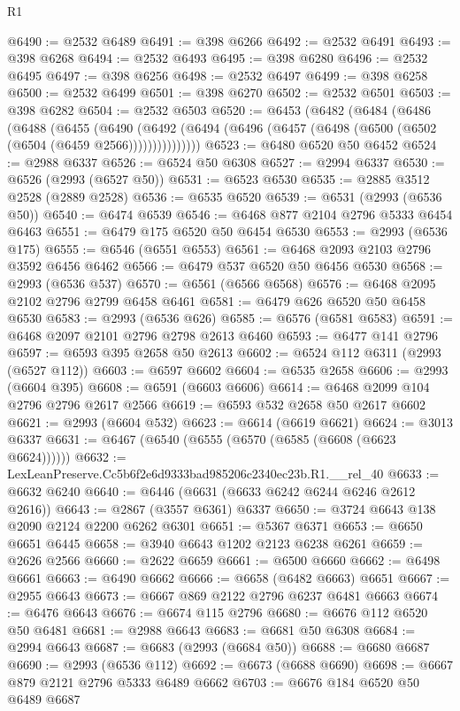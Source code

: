 \begin{lexlean}{R1}
\begin{coremodule}
@6490 := @2532 @6489
@6491 := @398 @6266
@6492 := @2532 @6491
@6493 := @398 @6268
@6494 := @2532 @6493
@6495 := @398 @6280
@6496 := @2532 @6495
@6497 := @398 @6256
@6498 := @2532 @6497
@6499 := @398 @6258
@6500 := @2532 @6499
@6501 := @398 @6270
@6502 := @2532 @6501
@6503 := @398 @6282
@6504 := @2532 @6503
@6520 := @6453
    (@6482
      (@6484
        (@6486
          (@6488
            (@6455
              (@6490
                (@6492 (@6494 (@6496 (@6457 (@6498 (@6500 (@6502 (@6504 (@6459 @2566)))))))))))))))
@6523 := @6480 @6520 @50 @6452
@6524 := @2988 @6337
@6526 := @6524 @50 @6308
@6527 := @2994 @6337
@6530 := @6526 (@2993 (@6527 @50))
@6531 := @6523 @6530
@6535 := @2885 @3512 @2528 (@2889 @2528)
@6536 := @6535 @6520
@6539 := @6531 (@2993 (@6536 @50))
@6540 := @6474 @6539
@6546 := @6468 @877 @2104 @2796 @5333 @6454 @6463
@6551 := @6479 @175 @6520 @50 @6454 @6530
@6553 := @2993 (@6536 @175)
@6555 := @6546 (@6551 @6553)
@6561 := @6468 @2093 @2103 @2796 @3592 @6456 @6462
@6566 := @6479 @537 @6520 @50 @6456 @6530
@6568 := @2993 (@6536 @537)
@6570 := @6561 (@6566 @6568)
@6576 := @6468 @2095 @2102 @2796 @2799 @6458 @6461
@6581 := @6479 @626 @6520 @50 @6458 @6530
@6583 := @2993 (@6536 @626)
@6585 := @6576 (@6581 @6583)
@6591 := @6468 @2097 @2101 @2796 @2798 @2613 @6460
@6593 := @6477 @141 @2796
@6597 := @6593 @395 @2658 @50 @2613
@6602 := @6524 @112 @6311 (@2993 (@6527 @112))
@6603 := @6597 @6602
@6604 := @6535 @2658
@6606 := @2993 (@6604 @395)
@6608 := @6591 (@6603 @6606)
@6614 := @6468 @2099 @104 @2796 @2796 @2617 @2566
@6619 := @6593 @532 @2658 @50 @2617 @6602
@6621 := @2993 (@6604 @532)
@6623 := @6614 (@6619 @6621)
@6624 := @3013 @6337
@6631 := @6467 (@6540 (@6555 (@6570 (@6585 (@6608 (@6623 @6624))))))
@6632 := LexLeanPreserve.Cc5b6f2e6d9333bad985206c2340ec23b.R1.__rel_40
@6633 := @6632 @6240
@6640 := @6446 (@6631 (@6633 @6242 @6244 @6246 @2612 @2616))
@6643 := @2867 (@3557 @6361) @6337
@6650 := @3724 @6643 @138 @2090 @2124 @2200 @6262 @6301
@6651 := @5367 @6371
@6653 := @6650 @6651 @6445
@6658 := @3940 @6643 @1202 @2123 @6238 @6261
@6659 := @2626 @2566
@6660 := @2622 @6659
@6661 := @6500 @6660
@6662 := @6498 @6661
@6663 := @6490 @6662
@6666 := @6658 (@6482 @6663) @6651
@6667 := @2955 @6643
@6673 := @6667 @869 @2122 @2796 @6237 @6481 @6663
@6674 := @6476 @6643
@6676 := @6674 @115 @2796
@6680 := @6676 @112 @6520 @50 @6481
@6681 := @2988 @6643
@6683 := @6681 @50 @6308
@6684 := @2994 @6643
@6687 := @6683 (@2993 (@6684 @50))
@6688 := @6680 @6687
@6690 := @2993 (@6536 @112)
@6692 := @6673 (@6688 @6690)
@6698 := @6667 @879 @2121 @2796 @5333 @6489 @6662
@6703 := @6676 @184 @6520 @50 @6489 @6687

\end{coremodule}
\end{lexlean}
